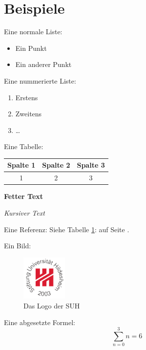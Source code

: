 \section{Beispiele}



Eine normale Liste:
\begin{itemize}
\item Ein Punkt
\item Ein anderer Punkt
\end{itemize}

Eine nummerierte Liste:
\begin{enumerate}
\item Erstens
\item Zweitens
\item \ldots
\end{enumerate}

Eine Tabelle:
\begin{table}[h]
    \centering
    \label{tab:bspTabelle}
    \begin{tabular}{|c|c|c|} \hline
        Spalte 1 & Spalte 2 & Spalte 3 \\ \hline
        1 & 2 & 3 \\ \hline
    \end{tabular}
\end{table}

\textbf{Fetter Text}

\textit{Kursiver Text}

Eine Referenz: Siehe Tabelle \ref{tab:bspTabelle}: 
auf Seite \pageref{tab:bspTabelle}.

Ein Bild:
\begin{figure}[htb]
\centering
\includegraphics[width=0.2\textwidth]{Bilder/St_Uni-Logo-9-2003-eps-converted-to.pdf}
\caption{Das Logo der SUH}
\label{fig:suh-logo}
\end{figure}

Eine abgesetzte Formel:
\begin{equation}
\sum_{n=0}^{3}n=6
\end{equation}

